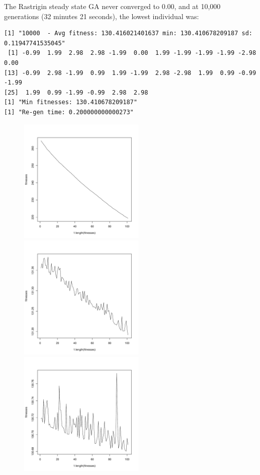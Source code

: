 \documentclass[12pt]{article}
\begin{document}
The Rastrigin steady state GA never converged to 0.00, and at 10,000 generations (32 minutes 21 seconds), the lowest individual was:
\scriptsize
\begin{lstlisting}
[1] "10000  - Avg fitness: 130.416021401637 min: 130.410678209187 sd: 0.11947741535045"
 [1] -0.99  1.99  2.98  2.98 -1.99  0.00  1.99 -1.99 -1.99 -1.99 -2.98  0.00
[13] -0.99  2.98 -1.99  0.99  1.99 -1.99  2.98 -2.98  1.99  0.99 -0.99 -1.99
[25]  1.99  0.99 -1.99 -0.99  2.98  2.98
[1] "Min fitnesses: 130.410678209187"
[1] "Re-gen time: 0.200000000000273"
\end{lstlisting}
\normalsize

\pagebreak

\begin{figure}[!h]
        \begin{center}
		\includegraphics[width=60mm]{images/rastrigin.ss/avg_303.pdf}
		\includegraphics[width=60mm]{images/rastrigin.ss/avg_1717.pdf}
		\includegraphics[width=60mm]{images/rastrigin.ss/avg_2424.pdf}

\end{center}
\end{figure}
\end{document}
